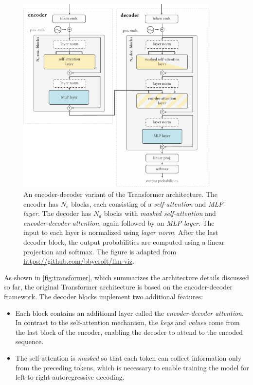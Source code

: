 {\begin{figure}[ht]
    \centering
    \includegraphics[width=0.9\textwidth]{img/transformer.pdf}
    \caption{An encoder-decoder variant of the Transformer architecture. The encoder has $N_{e}$ blocks, each consisting of a \emph{self-attention} and \emph{MLP layer}. The decoder has $N_{d}$ blocks with \emph{masked self-attention} and \emph{encoder-decoder attention}, again followed by an \emph{MLP layer}. The input to each layer is normalized using \emph{layer norm}. After the last decoder block, the output probabilities are computed using a linear projection and softmax. The figure is adapted from \href{https://github.com/bbycroft/llm-viz/blob/main/src/llm/intro-image.svg}{https://github.com/bbycroft/llm-viz}.}
    \label{fig:transformer}
\end{figure}



As shown in \autoref{fig:transformer}, which summarizes the architecture details discussed so far, the original Transformer architecture is based on the encoder-decoder framework. The decoder blocks implement two additional features:
\begin{itemize}
    \item Each block contains an additional layer called the \emph{encoder-decoder attention}. In contrast to the self-attention mechanism, the \emph{keys} and \emph{values} come from the last block of the encoder, enabling the decoder to attend to the encoded sequence.
    \item The self-attention is \emph{masked} so that each token can collect information only from the preceding tokens, which is necessary to enable training the model for left-to-right autoregressive decoding.
\end{itemize}

}
